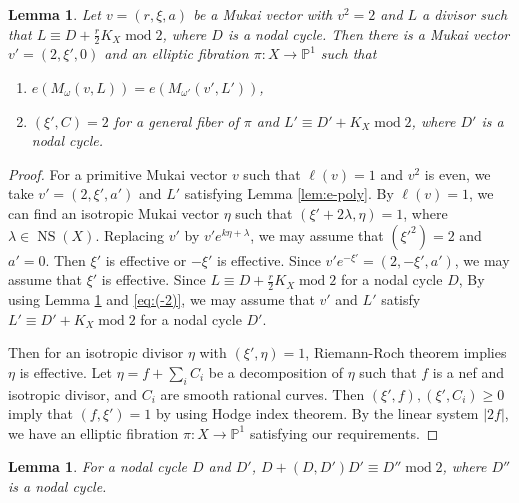 \documentclass[leqno,11pt]{amsart}
\def\P{\ensuremath{\mathbb{P}}}
\def\mod{\mathop{\mathrm{mod}}\nolimits}
\def\NS{\mathop{\mathrm{NS}}\nolimits}
\newtheorem{Lem}[Thm]{Lemma}
\theoremstyle{definition}
\def\P{\ensuremath{\mathbb{P}}}
\begin{document}
\begin{Lem}\label{lem:rank2}
Let $v=(r,\xi,a)$ be a Mukai vector with
$v^2=2$ and $L$ a divisor such that $L \equiv D+\frac{r}{2}K_X \mod 2$,
where $D$
is a nodal cycle.
Then there is a Mukai vector $v'=(2,\xi',0)$
and an elliptic fibration $\pi:X \to \P^1$
such that 
\begin{enumerate}
\item
$e(M_\omega(v,L))=e(M_{\omega'}(v',L'))$,
\item
$(\xi',C)=2$ for a general fiber of $\pi$
and $L' \equiv D' +K_X \mod 2$,
where $D'$ is a nodal cycle.
\end{enumerate}
\end{Lem}

\begin{proof}
For a primitive Mukai vector $v$ such that $\ell(v)=1$ and $v^2$ is even,
we take $v'=(2,\xi',a')$ and $L'$ satisfying
Lemma \ref{lem:e-poly}.
By $\ell(v)=1$, we can find an isotropic Mukai vector
$\eta$ such that
$(\xi'+2\lambda,\eta)=1$, where $\lambda \in \NS(X)$.   
Replacing $v'$ by $v' e^{k \eta+\lambda}$, we may assume that 
$({\xi'}^2)=2$ and $a'=0$.
Then $\xi'$ is effective or $-\xi'$ is effective.
Since $v' e^{-\xi'}=(2,-\xi',a')$, we may assume that $\xi'$ is effective.
Since $L \equiv D+\frac{r}{2}K_X \mod 2$ for a nodal cycle $D$, 
By using Lemma \ref{lem:nodal} and \eqref{eq:(-2)}, 
we may assume that $v'$ and $L'$ 
satisfy
$L' \equiv D'+K_X \mod 2$ for a nodal cycle $D'$.

Then for an isotropic divisor $\eta$ with $(\xi',\eta)=1$,
Riemann-Roch theorem implies
$\eta$ is effective.
Let $\eta=f+\sum_i C_i$ be a decomposition of $\eta$ such that 
$f$ is a nef and isotropic divisor, and $C_i$ are smooth rational curves.
Then $(\xi',f), (\xi',C_i) \geq 0$ imply that
$(f,\xi')=1$ by using Hodge index theorem.
By the linear system
$|2f|$, we have an elliptic fibration $\pi:X \to \P^1$
satisfying our requirements. 
\end{proof}


\begin{Lem}\label{lem:nodal}
For a nodal cycle $D$ and $D'$, 
 $D+(D,D')D' \equiv D'' \mod 2$, where $D''$ is a nodal cycle. 
\end{Lem}
\end{document}
